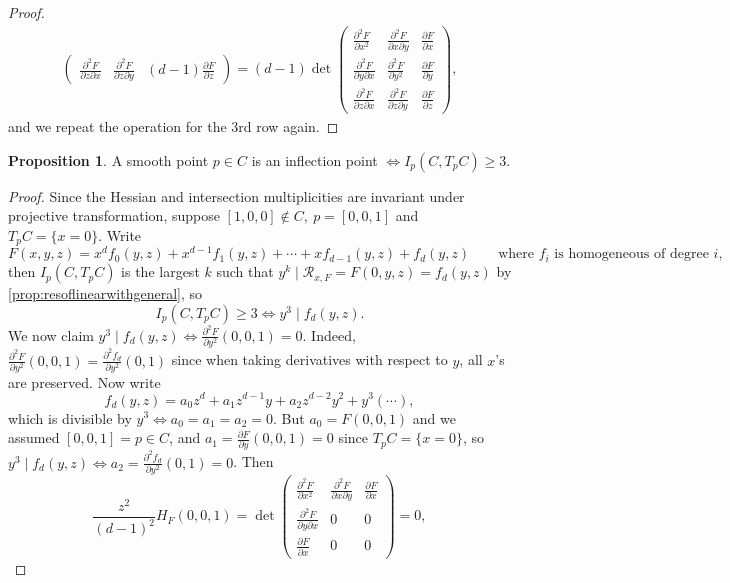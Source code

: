 \documentclass{article}
\newcommand{\re}{\mathcal{R}}
\theoremstyle{definition}
\newtheorem{prop}[defn]{Proposition}
\begin{document}
\begin{proof}
\[\begin{aligned}
\begin{pmatrix}
\frac{\partial^2 F}{\partial z\partial x} & \frac{\partial^2 F}{\partial z\partial y} & (d-1)\frac{\partial F}{\partial z}
\end{pmatrix}=(d-1)\det \begin{pmatrix}
\frac{\partial^2 F}{\partial x^2} & \frac{\partial^2 F}{\partial x\partial y} & \frac{\partial F}{\partial x} \\
\frac{\partial^2 F}{\partial y\partial x} & \frac{\partial^2 F}{\partial y^2} & \frac{\partial F}{\partial y} \\
\frac{\partial^2 F}{\partial z\partial x} & \frac{\partial^2 F}{\partial z\partial y} & \frac{\partial F}{\partial z}
\end{pmatrix},
\end{aligned}
\]
and we repeat the operation for the 3rd row again.
\end{proof}

\begin{prop}
A smooth point $p\in C$ is an inflection point $\iff I_p(C,T_pC)\geq 3$.
\end{prop}
\begin{proof}
Since the Hessian and intersection multiplicities are invariant under projective transformation, suppose $[1,0,0]\notin C,\ p=[0,0,1]$ and $T_pC=\{x=0\}$. Write
\[
F(x,y,z)=x^df_0(y,z)+x^{d-1}f_1(y,z)+\cdots+xf_{d-1}(y,z)+f_d(y,z)\qquad\text{where }f_i\text{ is homogeneous of degree }i,
\]
then $I_p(C,T_pC)$ is the largest $k$ such that $y^k\mid\re_{x,F}=F(0,y,z)=f_d(y,z)$ by \ref{prop:resoflinearwithgeneral}, so
\[
I_p(C,T_pC)\geq 3\iff y^3\mid f_d(y,z).
\]
We now claim $y^3\mid f_d(y,z)\iff\frac{\partial^2 F}{\partial y^2}(0,0,1)=0$. Indeed, $\frac{\partial^2 F}{\partial y^2}(0,0,1)=\frac{\partial^2 f_d}{\partial y^2}(0,1)$ since when taking derivatives with respect to $y$, all $x$'s are preserved. Now write
\[
f_d(y,z)=a_0z^d+a_1z^{d-1}y+a_2z^{d-2}y^2+y^3(\cdots),
\]
which is divisible by $y^3\iff a_0=a_1=a_2=0$. But $a_0=F(0,0,1)$ and we assumed $[0,0,1]=p\in C$, and $a_1=\frac{\partial F}{\partial y}(0,0,1)=0$ since $T_pC=\{x=0\}$, so $y^3\mid f_d(y,z)\iff a_2=\frac{\partial^2 f_d}{\partial y^2}(0,1)=0$. Then
\[
\frac{z^2}{(d-1)^2}H_F(0,0,1)=\det\begin{pmatrix}
\frac{\partial^2 F}{\partial x^2} & \frac{\partial^2 F}{\partial x\partial y} & \frac{\partial F}{\partial x} \\
\frac{\partial^2 F}{\partial y\partial x} & 0 & 0 \\
\frac{\partial F}{\partial x} & 0 & 0
\end{pmatrix}=0,
\]
\end{proof}
\end{document}
